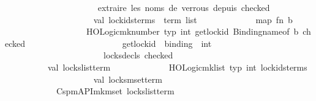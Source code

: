 \begin{isabellebody}
\ \ \ \ \ \ \ \ \ \ \isanewline
\ \ \ \ \ \ \ \ \ \ {\isacharparenleft}{\kern0pt}{\isacharasterisk}{\kern0pt}\ extraire\ les\ noms\ de\ verrous\ depuis\ checked\ {\isacharasterisk}{\kern0pt}{\isacharparenright}{\kern0pt}\isanewline
\ \ \ \ \ \ \ \ \ \ \isanewline
\ \ \ \ \ \ \ \ \ \ val\ lock{\isacharunderscore}{\kern0pt}ids{\isacharunderscore}{\kern0pt}terms\ {\isacharcolon}{\kern0pt}\ term\ list\ {\isacharequal}{\kern0pt}\isanewline
\ \ \ \ \ \ \ \ \ \ \ \ map\ {\isacharparenleft}{\kern0pt}fn\ {\isacharparenleft}{\kern0pt}b{\isacharcomma}{\kern0pt}\ {\isacharunderscore}{\kern0pt}{\isacharcomma}{\kern0pt}\ {\isacharunderscore}{\kern0pt}{\isacharparenright}{\kern0pt}\ {\isacharequal}{\kern0pt}{\isachargreater}{\kern0pt}\isanewline
\ \ \ \ \ \ \ \ \ \ \ \ \ \ \ \ \ \ \ HOLogic{\isachardot}{\kern0pt}mk{\isacharunderscore}{\kern0pt}number\ {\isacharat}{\kern0pt}{\isacharbraceleft}{\kern0pt}typ\ int{\isacharbraceright}{\kern0pt}\ {\isacharparenleft}{\kern0pt}get{\isacharunderscore}{\kern0pt}lock{\isacharunderscore}{\kern0pt}id\ {\isacharparenleft}{\kern0pt}Binding{\isachardot}{\kern0pt}name{\isacharunderscore}{\kern0pt}of\ b{\isacharparenright}{\kern0pt}\ checked{\isacharparenright}{\kern0pt}{\isacharparenright}{\kern0pt}\ \ \isanewline
\ \ \ \ \ \ \ \ \ \ \ \ \ \ \ \ \ \ \ {\isacharparenleft}{\kern0pt}{\isacharasterisk}{\kern0pt}\ get{\isacharunderscore}{\kern0pt}lock{\isacharunderscore}{\kern0pt}id\ {\isacharcolon}{\kern0pt}\ binding\ {\isacharminus}{\kern0pt}{\isachargreater}{\kern0pt}\ int\ {\isacharasterisk}{\kern0pt}{\isacharparenright}{\kern0pt}\isanewline
\ \ \ \ \ \ \ \ \ \ \ \ \ \ \ \ \ \ \ \ \ \ \ {\isacharparenleft}{\kern0pt}{\isacharhash}{\kern0pt}locks{\isacharunderscore}{\kern0pt}decls\ checked{\isacharparenright}{\kern0pt}\isanewline
\ \ \ \ \ \ \ \ \ \ \isanewline
\ \ \ \ \ \ \ \ \ \ val\ locks{\isacharunderscore}{\kern0pt}list{\isacharunderscore}{\kern0pt}term\ {\isacharequal}{\kern0pt}\isanewline
\ \ \ \ \ \ \ \ \ \ \ \ HOLogic{\isachardot}{\kern0pt}mk{\isacharunderscore}{\kern0pt}list\ {\isacharat}{\kern0pt}{\isacharbraceleft}{\kern0pt}typ\ int{\isacharbraceright}{\kern0pt}\ lock{\isacharunderscore}{\kern0pt}ids{\isacharunderscore}{\kern0pt}terms\isanewline
\ \ \ \ \ \ \ \ \ \ \isanewline
\ \ \ \ \ \ \ \ \ \ val\ locks{\isacharunderscore}{\kern0pt}mset{\isacharunderscore}{\kern0pt}term\ {\isacharequal}{\kern0pt}\isanewline
\ \ \ \ \ \ \ \ \ \ \ \ Cspm{\isacharunderscore}{\kern0pt}API{\isachardot}{\kern0pt}mk{\isacharunderscore}{\kern0pt}mset\ locks{\isacharunderscore}{\kern0pt}list{\isacharunderscore}{\kern0pt}term\ \ {\isacharparenleft}{\kern0pt}{\isacharasterisk}{\kern0pt}\ {\isacharbraceleft}{\kern0pt}{\isacharhash}{\kern0pt}\ {\isasymdots}\ {\isacharhash}{\kern0pt}{\isacharbraceright}{\kern0pt}\ {\isacharasterisk}{\kern0pt}{\isacharparenright}{\kern0pt}\isanewline

\end{isabellebody}
